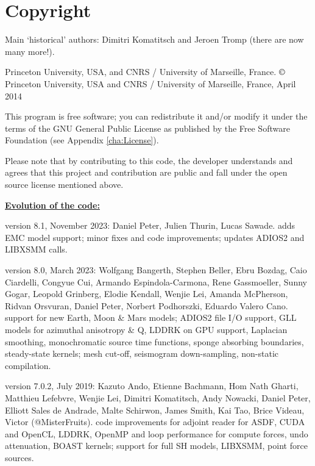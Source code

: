 \chapter*{Copyright}\label{cha:Copyright}

Main `historical' authors: Dimitri Komatitsch and Jeroen Tromp (there are now many more!).

Princeton University, USA, and CNRS / University of Marseille, France.\newline
$\copyright$ Princeton University, USA and CNRS / University of Marseille, France, April 2014\newline

\noindent
This program is free software; you can redistribute it and/or modify
it under the terms of the GNU General Public License as published
by the Free Software Foundation (see Appendix \ref{cha:License}).\newline

\noindent
Please note that by contributing to this code, the developer understands and agrees that this project and contribution
are public and fall under the open source license mentioned above.\newline

\noindent
\textbf{\underline{Evolution of the code:}}\newline

 version 8.1, November 2023:
   Daniel Peter, Julien Thurin, Lucas Sawade.
      adds EMC model support; minor fixes and code improvements; updates ADIOS2 and LIBXSMM calls.\newline

 version 8.0, March 2023:
   Wolfgang Bangerth, Stephen Beller, Ebru Bozdag, Caio Ciardelli, Congyue Cui, Armando Espindola-Carmona,
   Rene Gassmoeller, Sunny Gogar, Leopold Grinberg, Elodie Kendall, Wenjie Lei, Amanda McPherson, Ridvan Orsvuran,
   Daniel Peter, Norbert Podhorszki, Eduardo Valero Cano.
     support for new Earth, Moon \& Mars models; ADIOS2 file I/O support, GLL models for azimuthal anisotropy \& Q,
     LDDRK on GPU support, Laplacian smoothing, monochromatic source time functions, sponge absorbing boundaries,
     steady-state kernels; mesh cut-off, seismogram down-sampling, non-static compilation.\newline

 version 7.0.2, July 2019:
   Kazuto Ando, Etienne Bachmann, Hom Nath Gharti, Matthieu Lefebvre, Wenjie Lei, Dimitri Komatitsch, Andy Nowacki,
   Daniel Peter, Elliott Sales de Andrade, Malte Schirwon, James Smith, Kai Tao, Brice Videau, Victor (@MisterFruits).
     code improvements for adjoint reader for ASDF, CUDA and OpenCL, LDDRK, OpenMP and loop performance for compute forces,
     undo attenuation, BOAST kernels; support for full SH models, LIBXSMM, point force sources.\newline

